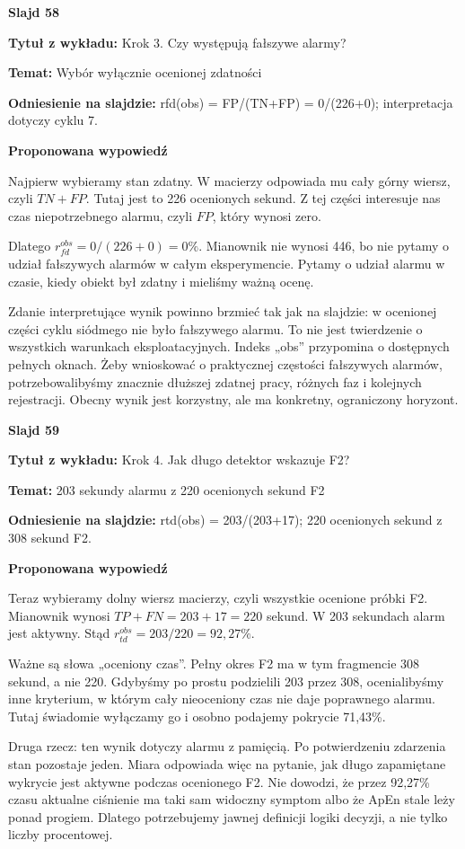 \documentclass[a4paper,11pt]{article}
\newcommand{\NumerSlajdu}{1}
\newcommand{\Komentarz}[3]{%
  \gdef\NumerSlajdu{#1}%
  {\Large\bfseries Slajd #1\par}\smallskip
  \textbf{Tytuł z wykładu:} #2\par
  \textbf{Temat:} #3\par\medskip
}
\begin{document}
\Komentarz{58}{Krok 3. Czy występują fałszywe alarmy?}{Wybór wyłącznie ocenionej zdatności}
{\small\color{black!65}\textbf{Odniesienie na slajdzie:} rfd(obs) = FP/(TN+FP) = 0/(226+0); interpretacja dotyczy cyklu 7.\par}
\medskip
\textbf{Proponowana wypowiedź}\par
Najpierw wybieramy stan zdatny. W macierzy odpowiada mu cały górny wiersz, czyli $TN+FP$. Tutaj jest to 226 ocenionych sekund. Z tej części interesuje nas czas niepotrzebnego alarmu, czyli $FP$, który wynosi zero.

Dlatego $r_{fd}^{obs}=0/(226+0)=0\%$. Mianownik nie wynosi 446, bo nie pytamy o udział fałszywych alarmów w całym eksperymencie. Pytamy o udział alarmu w czasie, kiedy obiekt był zdatny i mieliśmy ważną ocenę.

Zdanie interpretujące wynik powinno brzmieć tak jak na slajdzie: w ocenionej części cyklu siódmego nie było fałszywego alarmu. To nie jest twierdzenie o wszystkich warunkach eksploatacyjnych. Indeks „obs” przypomina o dostępnych pełnych oknach. Żeby wnioskować o praktycznej częstości fałszywych alarmów, potrzebowalibyśmy znacznie dłuższej zdatnej pracy, różnych faz i kolejnych rejestracji. Obecny wynik jest korzystny, ale ma konkretny, ograniczony horyzont.
\clearpage

\Komentarz{59}{Krok 4. Jak długo detektor wskazuje F2?}{203 sekundy alarmu z 220 ocenionych sekund F2}
{\small\color{black!65}\textbf{Odniesienie na slajdzie:} rtd(obs) = 203/(203+17); 220 ocenionych sekund z 308 sekund F2.\par}
\medskip
\textbf{Proponowana wypowiedź}\par
Teraz wybieramy dolny wiersz macierzy, czyli wszystkie ocenione próbki F2. Mianownik wynosi $TP+FN=203+17=220$ sekund. W 203 sekundach alarm jest aktywny. Stąd $r_{td}^{obs}=203/220=92{,}27\%$.

Ważne są słowa „oceniony czas”. Pełny okres F2 ma w tym fragmencie 308 sekund, a nie 220. Gdybyśmy po prostu podzielili 203 przez 308, ocenialibyśmy inne kryterium, w którym cały nieoceniony czas nie daje poprawnego alarmu. Tutaj świadomie wyłączamy go i osobno podajemy pokrycie 71,43\%.

Druga rzecz: ten wynik dotyczy alarmu z pamięcią. Po potwierdzeniu zdarzenia stan pozostaje jeden. Miara odpowiada więc na pytanie, jak długo zapamiętane wykrycie jest aktywne podczas ocenionego F2. Nie dowodzi, że przez 92,27\% czasu aktualne ciśnienie ma taki sam widoczny symptom albo że ApEn stale leży ponad progiem. Dlatego potrzebujemy jawnej definicji logiki decyzji, a nie tylko liczby procentowej.
\clearpage
\end{document}
